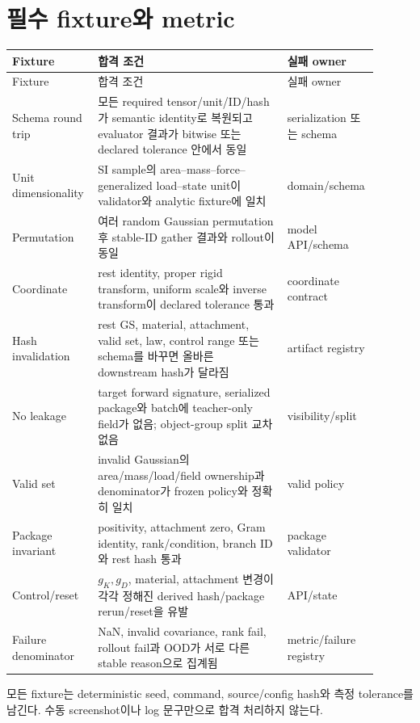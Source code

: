 \documentclass[10pt]{article}
\begin{document}
\section{필수 fixture와 metric}
\label{sec:r0-chapter-7}

\begin{longtable}{L{0.22\linewidth}L{0.50\linewidth}L{0.18\linewidth}}
\toprule
Fixture & 합격 조건 & 실패 owner\\
\midrule
\endfirsthead
\toprule
Fixture & 합격 조건 & 실패 owner\\
\midrule
\endhead
Schema round trip & 모든 required tensor/unit/ID/hash가 semantic identity로 복원되고 evaluator 결과가 bitwise 또는 declared tolerance 안에서 동일 & serialization 또는 schema\\
Unit dimensionality & SI sample의 area--mass--force--generalized load--state unit이 validator와 analytic fixture에 일치 & domain/schema\\
Permutation & 여러 random Gaussian permutation 후 stable-ID gather 결과와 rollout이 동일 & model API/schema\\
Coordinate & rest identity, proper rigid transform, uniform scale와 inverse transform이 declared tolerance 통과 & coordinate contract\\
Hash invalidation & rest GS, material, attachment, valid set, law, control range 또는 schema를 바꾸면 올바른 downstream hash가 달라짐 & artifact registry\\
No leakage & target forward signature, serialized package와 batch에 teacher-only field가 없음; object-group split 교차 없음 & visibility/split\\
Valid set & invalid Gaussian의 area/mass/load/field ownership과 denominator가 frozen policy와 정확히 일치 & valid policy\\
Package invariant & positivity, attachment zero, Gram identity, rank/condition, branch ID와 rest hash 통과 & package validator\\
Control/reset & \(g_K,g_D\), material, attachment 변경이 각각 정해진 derived hash/package rerun/reset을 유발 & API/state\\
Failure denominator & NaN, invalid covariance, rank fail, rollout fail과 OOD가 서로 다른 stable reason으로 집계됨 & metric/failure registry\\
\bottomrule
\end{longtable}

모든 fixture는 deterministic seed, command, source/config hash와 측정 tolerance를 남긴다.
수동 screenshot이나 log 문구만으로 합격 처리하지 않는다.
\end{document}
